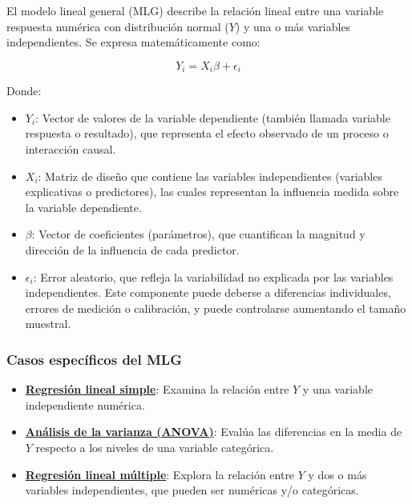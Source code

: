 \documentclass[
  spanish,
  a4paper,
]{scrbook}
\begin{document}
El modelo lineal general (MLG) describe la relación lineal entre una
variable respuesta numérica con distribución normal (\(Y\)) y una o más
variables independientes. Se expresa matemáticamente como:

\[
Y_i = X_i\beta + \epsilon_i
\]

Donde:

\begin{itemize}
\item
  \(Y_i\): Vector de valores de la variable dependiente (también llamada
  variable respuesta o resultado), que representa el efecto observado de
  un proceso o interacción causal.
\item
  \(X_i\): Matriz de diseño que contiene las variables independientes
  (variables explicativas o predictores), las cuales representan la
  influencia medida sobre la variable dependiente.
\item
  \(\beta\): Vector de coeficientes (parámetros), que cuantifican la
  magnitud y dirección de la influencia de cada predictor.
\item
  \(\epsilon_i\): Error aleatorio, que refleja la variabilidad no
  explicada por las variables independientes. Este componente puede
  deberse a diferencias individuales, errores de medición o calibración,
  y puede controlarse aumentando el tamaño muestral.
\end{itemize}

\subsubsection{Casos específicos del
MLG}\label{casos-especuxedficos-del-mlg}

\begin{itemize}
\item
  \href{04_reg_lineal.qmd}{\textbf{Regresión lineal simple}}: Examina la
  relación entre \(Y\) y una variable independiente numérica.
\item
  \href{05_anova.qmd}{\textbf{Análisis de la varianza (ANOVA)}}: Evalúa
  las diferencias en la media de \(Y\) respecto a los niveles de una
  variable categórica.
\item
  \href{07_reg_lineal_multiple.qmd}{\textbf{Regresión lineal múltiple}}:
  Explora la relación entre \(Y\) y dos o más variables independientes,
  que pueden ser numéricas y/o categóricas.
\end{itemize}
\end{document}

